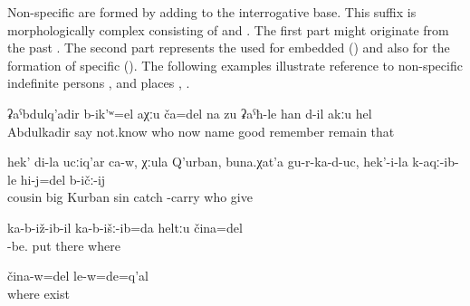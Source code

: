 Non-specific  are formed by adding  to the interrogative base. This suffix is morphologically complex consisting of  and . The first part might originate from the past  . The second part represents the  used for embedded  () and also for the formation of specific  (). The following examples illustrate reference to non-specific indefinite persons ,  and places , .
%
\begin{exe}
	\ex	\label{ex:He was called Abdukhaliq or something (lit. somebody), I don't know, I don't remember this name well}
	\gll	ʡaˁbdulq'adir	b-ik'ʷ=el	aχːu	ča=del	na	zu	ʡaˁħ-le	han	d-il	akːu	hel\\
		Abdulkadir	say	not.know	who	now	name	good	remember	remain		that\\
	\glt	{}

	\ex	\label{ex:My cousin, Old Kurban, may his sins be relieved, brought them for me to give them to someone}
	\gll	hek'	di-la	ucːiq'ar ca-w,	χːula	Q'urban,	buna.χat'a	gu-r-ka-d-uc,		hek'-i-la	k-aqː-ib-le	hi-j=del	b-ičː-ij\\
				cousin		big	Kurban	sin	catch			-carry	who	give\\
	\glt	{}
	
	\ex	\label{ex:I put (the picture) somewhere}
	\gll	ka-b-iž-ib-il	ka-b-išː-ib=da	heltːu	čina=del\\
		-be.	put	there	where\\
	\glt	{}

	\ex	\label{ex:He was somewhere}
	\gll	čina-w=del	le-w=de=q'al\\
		where	exist\\
	\glt	{}


\end{exe}


